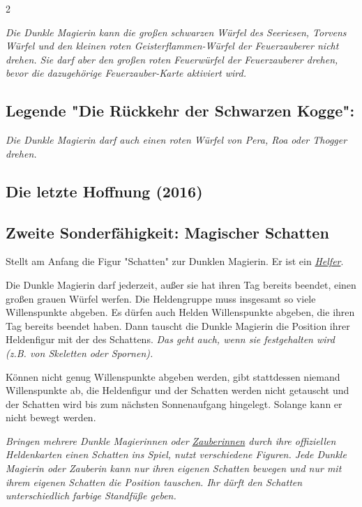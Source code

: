 \documentclass[10pt, a4paper, oneside]{book}
\newcommand{\fan}[1]{\textit{#1}}
\begin{document}
\begin{multicols*}{2}
\begin{bgcolor}
\fan{Die Dunkle Magierin kann die großen schwarzen Würfel des Seeriesen, Torvens Würfel und den kleinen roten Geisterflammen-Würfel der Feuerzauberer nicht drehen. Sie darf aber den großen roten Feuerwürfel der Feuerzauberer drehen, bevor die dazugehörige Feuerzauber-Karte aktiviert wird.}




\subsection{Legende "Die Rückkehr der Schwarzen Kogge":}

\fan{Die Dunkle Magierin darf auch einen roten Würfel von Pera, Roa oder Thogger drehen.}

\end{bgcolor}




\begin{bgcolor}
\section{Die letzte Hoffnung (2016)}

\subsection{Zweite Sonderfähigkeit: Magischer Schatten}

Stellt am Anfang die Figur "Schatten" zur Dunklen Magierin. Er ist ein \hyperref[Helfer]{\fan{Helfer}}.

Die Dunkle Magierin darf jederzeit, außer sie hat ihren Tag bereits beendet, einen großen grauen Würfel werfen. Die Heldengruppe muss insgesamt so viele Willenspunkte abgeben. Es dürfen auch Helden Willenspunkte abgeben, die ihren Tag bereits beendet haben. Dann tauscht die Dunkle Magierin die Position ihrer Heldenfigur mit der des Schattens. \fan{Das geht auch, wenn sie festgehalten wird (z.B. von Skeletten oder Spornen).}
 

Können nicht genug Willenspunkte abgeben werden, gibt stattdessen niemand Willenspunkte ab, die Heldenfigur und der Schatten werden nicht getauscht und der Schatten wird bis zum nächsten Sonnenaufgang hingelegt. Solange kann er nicht bewegt werden.
\supercite{Dunkle_Eara:Regelkarte,Dunkle_Eara:Heldenkarte}


\fan{Bringen mehrere Dunkle Magierinnen oder \hyperref[Zauberin]{Zauberinnen} durch ihre offiziellen Heldenkarten einen Schatten ins Spiel, nutzt verschiedene Figuren. Jede Dunkle Magierin oder Zauberin kann nur ihren eigenen Schatten bewegen und nur mit ihrem eigenen Schatten die Position tauschen. Ihr dürft den Schatten unterschiedlich farbige Standfüße geben.}





\end{bgcolor}
\end{multicols*}
\end{document}
